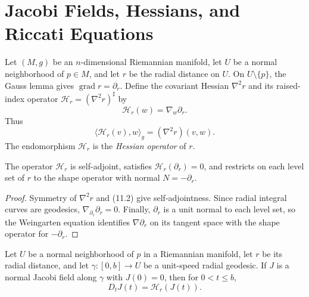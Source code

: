 \section{Jacobi Fields, Hessians, and Riccati Equations}

Let $(M,g)$ be an $n$-dimensional Riemannian manifold, let $U$ be a normal
neighborhood of $p\in M$, and let $r$ be the radial distance on $U$.  On
$U\setminus\{p\}$, the Gauss lemma gives $\operatorname{grad}r=\partial_r$.
Define the covariant Hessian $\nabla^2r$ and its raised-index operator
$\mathcal H_r=(\nabla^2r)^\sharp$ by
\begin{equation}
\mathcal H_r(w)=\nabla_w\partial_r. \tag{11.1}
\end{equation}
Thus
\begin{equation}
\langle\mathcal H_r(v),w\rangle_g=(\nabla^2r)(v,w). \tag{11.2}
\end{equation}
The endomorphism $\mathcal H_r$ is the \emph{Hessian operator} of $r$.

\begin{lemma}
\label{lem:hessian-operator-properties}
The operator $\mathcal H_r$ is self-adjoint, satisfies
$\mathcal H_r(\partial_r)=0$, and restricts on each level set of $r$ to the
shape operator with normal $N=-\partial_r$.
\end{lemma}

\begin{proof}
\sketch
Symmetry of $\nabla^2r$ and (11.2) give self-adjointness.  Since radial integral
curves are geodesics, $\nabla_{\partial_r}\partial_r=0$.  Finally,
$\partial_r$ is a unit normal to each level set, so the Weingarten equation
identifies $\nabla\partial_r$ on its tangent space with the shape operator for
$-\partial_r$.
\end{proof}

\begin{proposition}
\label{prop:jacobi-field-hessian-equation}
Let $U$ be a normal neighborhood of $p$ in a Riemannian manifold, let
$r$ be its radial distance, and let $\gamma:[0,b]\to U$ be a unit-speed radial
geodesic.  If $J$ is a normal Jacobi field along $\gamma$ with $J(0)=0$, then
for $0<t\leq b$,
\begin{equation}
D_tJ(t)=\mathcal H_r(J(t)). \tag{11.3}
\end{equation}
\end{proposition}

